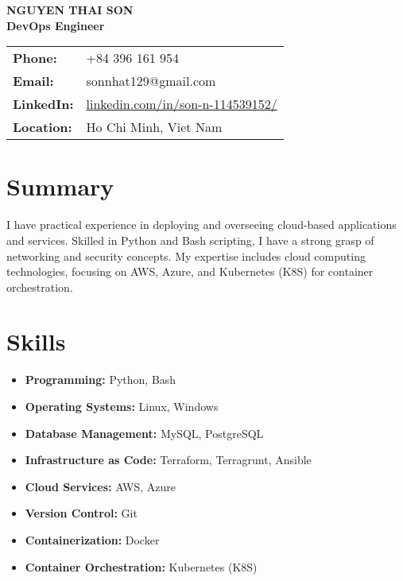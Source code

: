 \documentclass[a4paper,10pt]{article}
\begin{document}
\begin{center}
    {\Huge \textbf{NGUYEN THAI SON}} \\
    \vspace{6pt}
    \textbf{DevOps Engineer} \\
    \vspace{6pt}
    \begin{tabular}{ll}
        \textbf{Phone:} & +84 396 161 954 \\
        \textbf{Email:} & sonnhat129@gmail.com \\
        \textbf{LinkedIn:} & \href{https://www.linkedin.com/in/son-n-114539152/}{linkedin.com/in/son-n-114539152/} \\
        \textbf{Location:} & Ho Chi Minh, Viet Nam \\
    \end{tabular}
\end{center}

\vspace{10pt}
\section*{Summary}
I have practical experience in deploying and overseeing cloud-based applications and services. Skilled in Python and Bash scripting, I have a strong grasp of networking and security concepts. My expertise includes cloud computing technologies, focusing on AWS, Azure, and Kubernetes (K8S) for container orchestration.

\vspace{5pt}
\section*{Skills}
\begin{itemize}[leftmargin=0.5in]
    \item \textbf{Programming:} Python, Bash
    \item \textbf{Operating Systems:} Linux, Windows
    \item \textbf{Database Management:} MySQL, PostgreSQL
    \item \textbf{Infrastructure as Code:} Terraform, Terragrunt, Ansible
    \item \textbf{Cloud Services:} AWS, Azure
    \item \textbf{Version Control:} Git
    \item \textbf{Containerization:} Docker
    \item \textbf{Container Orchestration:} Kubernetes (K8S)
\end{itemize}
\end{document}
